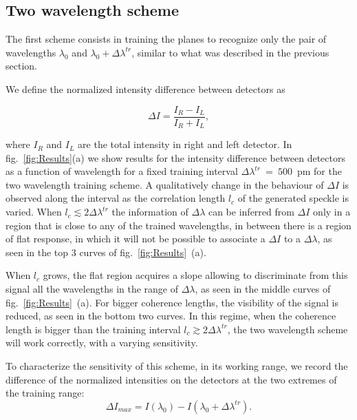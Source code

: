 \documentclass{optica-article}
\begin{document}
\subsection{Two wavelength scheme}

The first scheme consists in training the planes to recognize only the pair of wavelengths $\lambda_0$ and $\lambda_0 + \Delta \lambda^{tr}$, similar to what was described in the previous section.

We define the normalized intensity difference between detectors as

\begin{equation}
    \Delta I = \frac{I_R - I_L}{I_R + I_L},
\end{equation}

where $I_R$ and $I_L$ are the total intensity in right and left detector. In fig.~\ref{fig:Results}(a) we show results for the intensity difference between detectors as a function of wavelength for a fixed training interval $\Delta \lambda^{tr}$~=~$500$~pm for the two wavelength training scheme. A qualitatively change in the behaviour of $\Delta I$ is observed along the interval as the correlation length $l_c$ of the generated speckle is varied. When $l_c \lesssim 2 \Delta \lambda^{tr}$ the information of $\Delta \lambda$ can be inferred from $\Delta I$ only in a region that is close to any of the trained wavelengths, in between there is a region of flat response, in which it will not be possible to associate a $\Delta I$ to a $\Delta \lambda$, as seen in the top 3 curves of fig.~\ref{fig:Results}~(a).

When $l_c$ grows, the flat region acquires a slope allowing to discriminate from this signal all the wavelengths in the range of $\Delta \lambda$, as seen in the middle curves of fig.~\ref{fig:Results}~(a). For bigger coherence lengths, the visibility of the signal is reduced, as seen in the bottom two curves. In this regime, when the coherence length is bigger than the training interval $l_c \gtrsim 2 \Delta \lambda^{tr}$, the two wavelength scheme will work correctly, with a varying sensitivity. 

To characterize the sensitivity of this scheme, in its working range, we record the difference of the normalized intensities on the detectors at the two extremes of the training range:
\begin{equation}
    \Delta I_{max} = I(\lambda_0)-I(\lambda_0+\Delta\lambda^\mathit{tr}).
\end{equation}
\end{document}
